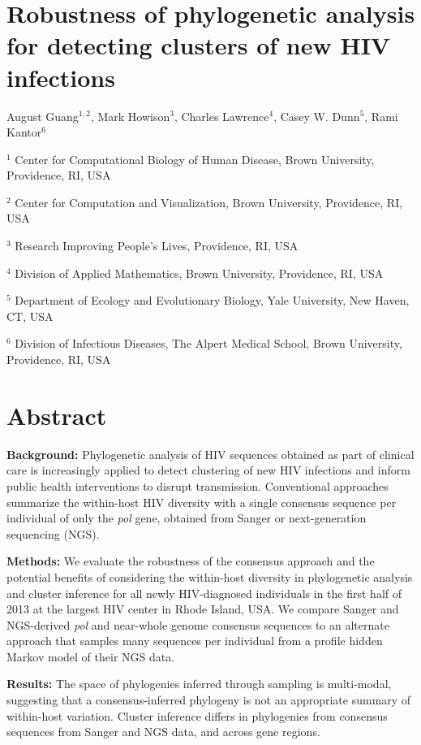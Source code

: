 \documentclass[letterpaper]{article}
\begin{document}
\section*{Robustness of phylogenetic analysis for detecting clusters of new HIV infections}

August Guang$^{1,2}$, Mark Howison$^3$, Charles Lawrence$^4$, Casey W. Dunn$^5$, Rami Kantor$^6$

$^1$ Center for Computational Biology of Human Disease, Brown University, Providence, RI, USA

$^2$ Center for Computation and Visualization, Brown University, Providence, RI, USA

$^3$ Research Improving People's Lives, Providence, RI, USA

$^4$ Division of Applied Mathematics, Brown University, Providence, RI, USA

$^5$ Department of Ecology and Evolutionary Biology, Yale University, New Haven, CT, USA

$^6$ Division of Infectious Diseases, The Alpert Medical School, Brown University, Providence, RI, USA

\doublespace
\linenumbers
\section*{Abstract}

\textbf{Background:} Phylogenetic analysis of HIV sequences obtained as part of clinical care is increasingly applied to detect clustering of new HIV infections and inform public health interventions to disrupt transmission. Conventional approaches summarize the within-host HIV diversity with a single consensus sequence per individual of only the \emph{pol} gene, obtained from Sanger or next-generation sequencing (NGS).

\textbf{Methods:} We evaluate the robustness of the consensus approach and the potential benefits of considering the within-host diversity in phylogenetic analysis and cluster inference for all newly HIV-diagnosed individuals in the first half of 2013 at the largest HIV center in Rhode Island, USA. We compare Sanger and NGS-derived \emph{pol} and near-whole genome consensus sequences to an alternate approach that samples many sequences per individual from a profile hidden Markov model of their NGS data.

\textbf{Results:} The space of phylogenies inferred through sampling is multi-modal, suggesting that a consensus-inferred phylogeny is not an appropriate summary of within-host variation. Cluster inference differs in phylogenies from consensus sequences from Sanger and NGS data, and across gene regions.
\end{document}
